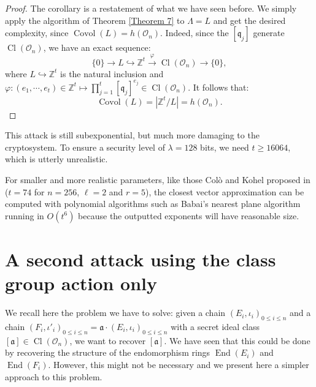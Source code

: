 \documentclass[a4paper,10pt,notitlepage]{report}
\theoremstyle{definition}
\theoremstyle{plain}
\theoremstyle{definition}
\newcommand{\Z}{\mathbb{Z}}
\newcommand{\mO}{\mathcal{O}}
\renewcommand{\(}{\left(}
\renewcommand{\)}{\right)}
\newcommand{\mf}[1]{\mathfrak{#1}}
\DeclareMathOperator{\End}{End}
\DeclareMathOperator{\Cl}{Cl}
\DeclareMathOperator{\Covol}{Covol}
\begin{document}
\begin{proof}
The corollary is a restatement of what we have seen before. We simply apply the algorithm of Theorem \ref{Theorem 7} to $\Lambda=L$ and get the desired complexity, since $\Covol(L)=h(\mO_n)$.  Indeed, since the $[\mf{q}_j]$ generate $\Cl(\mO_n)$, we have an exact sequence:
\[\{0\}\longrightarrow L\hookrightarrow \Z^t\overset{\varphi}{\longrightarrow} \Cl(\mO_n)\longrightarrow\{0\},\]
where $ L\hookrightarrow \Z^t$ is the natural inclusion and $\varphi : (e_1,\cdots,e_t)\in\Z^t\longmapsto \prod_{j=1}^t[\mf{q}_j]^{e_j}\in \Cl(\mO_n)$. It follows that:
\[\Covol(L)=|\Z^t/L|=h(\mO_n).\]
\end{proof}

This attack is still subexponential, but much more damaging to the cryptosystem. To ensure a security level of $\lambda=128$ bits, we need $t\geq 16064$, which is utterly unrealistic. 

For smaller and more realistic parameters, like those Col\`{o} and Kohel proposed in \cite[Section 6]{OSIDH} ($t=74$ for $n=256$, $\ell=2$ and $r=5$), the closest vector approximation can be computed with polynomial algorithms such as Babai's nearest plane algorithm \cite{Babai} running in $O(t^6)$ because the outputted exponents will have reasonable size. 

\section{A second attack using the class group action only}\label{Paragraph 21}

We recall here the problem we have to solve: given a chain $(E_i,\iota_i)_{0\leq i\leq n}$ and a chain $(F_i,\iota'_i)_{0\leq i\leq n}=\mf{a}\cdot(E_i,\iota_i)_{0\leq i\leq n}$ with a secret ideal class $[\mf{a}]\in\Cl(\mO_n)$, we want to recover $[\mf{a}]$. We have seen that this could be done by recovering the structure of the endomorphism rings $\End(E_i)$ and $\End(F_i)$. However, this might not be necessary and we present here a simpler approach to this problem. 
\end{document}
